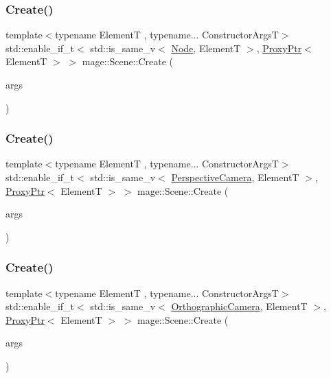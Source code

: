 \subsubsection{\texorpdfstring{Create()}{Create()}\hspace{0.1cm}{\footnotesize\ttfamily [1/11]}}
{\footnotesize\ttfamily template$<$typename ElementT , typename... Constructor\+ArgsT$>$ \\
std\+::enable\+\_\+if\+\_\+t$<$ std\+::is\+\_\+same\+\_\+v$<$ \hyperlink{classmage_1_1_node}{Node}, ElementT $>$, \hyperlink{classmage_1_1_proxy_ptr}{Proxy\+Ptr}$<$ ElementT $>$ $>$ mage\+::\+Scene\+::\+Create (\begin{DoxyParamCaption}\item[{Constructor\+ArgsT \&\&...}]{args }\end{DoxyParamCaption})}

\hypertarget{classmage_1_1_scene_afe0553fea0bb6d19cfd389402df083a3}{}\label{classmage_1_1_scene_afe0553fea0bb6d19cfd389402df083a3} 
\subsubsection{\texorpdfstring{Create()}{Create()}\hspace{0.1cm}{\footnotesize\ttfamily [2/11]}}
{\footnotesize\ttfamily template$<$typename ElementT , typename... Constructor\+ArgsT$>$ \\
std\+::enable\+\_\+if\+\_\+t$<$ std\+::is\+\_\+same\+\_\+v$<$ \hyperlink{classmage_1_1_perspective_camera}{Perspective\+Camera}, ElementT $>$, \hyperlink{classmage_1_1_proxy_ptr}{Proxy\+Ptr}$<$ ElementT $>$ $>$ mage\+::\+Scene\+::\+Create (\begin{DoxyParamCaption}\item[{Constructor\+ArgsT \&\&...}]{args }\end{DoxyParamCaption})}

\hypertarget{classmage_1_1_scene_a0aa1fcb93706550b11ffbb547e5c977e}{}\label{classmage_1_1_scene_a0aa1fcb93706550b11ffbb547e5c977e} 
\subsubsection{\texorpdfstring{Create()}{Create()}\hspace{0.1cm}{\footnotesize\ttfamily [3/11]}}
{\footnotesize\ttfamily template$<$typename ElementT , typename... Constructor\+ArgsT$>$ \\
std\+::enable\+\_\+if\+\_\+t$<$ std\+::is\+\_\+same\+\_\+v$<$ \hyperlink{classmage_1_1_orthographic_camera}{Orthographic\+Camera}, ElementT $>$, \hyperlink{classmage_1_1_proxy_ptr}{Proxy\+Ptr}$<$ ElementT $>$ $>$ mage\+::\+Scene\+::\+Create (\begin{DoxyParamCaption}\item[{Constructor\+ArgsT \&\&...}]{args }\end{DoxyParamCaption})}

